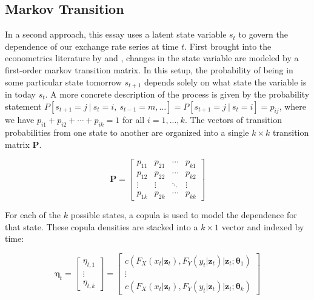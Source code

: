 \documentclass[12pt]{article}
\begin{document}
\subsection{Markov Transition}

In a second approach, this essay uses a latent state variable $s_{t}$ to govern the dependence of our exchange rate series at time $t$. First brought into the econometrics literature by \cite{Hamilton_1989} and \cite{Hamilton_1994}, changes in the state variable are modeled by a first-order markov transition matrix. In this setup, the probability of being in some particular state tomorrow $s_{t+1}$ depends solely on what state the variable is in today $s_{t}$. A more concrete description of the process is given by the probability statement $P\left[s_{t + 1} = j~|~s_{t}=i,~s_{t-1} = m,\ldots \right] = P\left[s_{t+1}=j~|~s_{t} = i\right] = p_{ij}$, where we have $p_{i1} + p_{i2} + \cdots + p_{ik}=1$ for all $i = 1,...,k$. The vectors of transition probabilities from one state to another are organized into a single $k\times k$ transition matrix $\mathbf{P}$.

\begin{equation}
\mathbf{P}=\left[ 
\begin{array}{cccc}
p_{11} & p_{21} & \cdots & p_{k1} \\ 
p_{12} & p_{22} & \cdots & p_{k2} \\ 
\vdots & \vdots & \ddots & \vdots \\ 
p_{1k} & p_{2k} & \cdots & p_{kk}
\end{array}
\right]
\end{equation}

For each of the $k$ possible states, a copula is used to model the dependence for that state. These copula densities are stacked into a $k\times 1$ vector and indexed by time:

\begin{equation}
\boldsymbol{\eta}_{t} = \left[ 
\begin{array}{c}
\eta _{t,1} \\ 
\vdots \\ 
\eta _{t,k}
\end{array}
\right] = \left[
\begin{array}{c}
c\left(F_{X}\left(x_{t} | \boldsymbol{z}_{t}\right), F_{Y}\left(y_{t} | \boldsymbol{z}_{t}\right) | \boldsymbol{z}_{t} ;\mathbf{\theta}_{1}\right) \\ 
\vdots \\ 
c\left(F_{X}\left(x_{t} | \boldsymbol{z}_{t}\right), F_{Y}\left(y_{t} | \boldsymbol{z}_{t}\right) | \boldsymbol{z}_{t} ;\mathbf{\theta }_{k}\right)
\end{array}
\right]
\end{equation}
\end{document}
